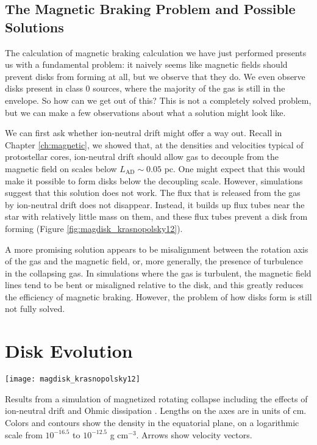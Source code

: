 \subsection{The Magnetic Braking Problem and Possible Solutions}

The calculation of magnetic braking calculation we have just performed presents us with a fundamental problem: it naively seems like magnetic fields should prevent disks from forming at all, but we observe that they do. We even observe disks present in class 0 sources, where the majority of the gas is still in the envelope. So how can we get out of this? This is not a completely solved problem, but we can make a few observations about what a solution might look like.

We can first ask whether ion-neutral drift might offer a way out. Recall in Chapter \ref{ch:magnetic}, we showed that, at the densities and velocities typical of protostellar cores, ion-neutral drift should allow gas to decouple from the magnetic field on scales below $L_{\mathrm{AD}} \sim 0.05$ pc. One might expect that this would make it possible to form disks below the decoupling scale. However, simulations suggest that this solution does not work. The flux that is released from the gas by ion-neutral drift does not disappear. Instead, it builds up flux tubes near the star with relatively little mass on them, and these flux tubes prevent a disk from forming (Figure \ref{fig:magdisk_krasnopolsky12}).

A more promising solution appears to be misalignment between the rotation axis of the gas and the magnetic field, or, more generally, the presence of turbulence in the collapsing gas. In simulations where the gas is turbulent, the magnetic field lines tend to be bent or misaligned relative to the disk, and this greatly reduces the efficiency of magnetic braking. However, the problem of how disks form is still not fully solved.

\section{Disk Evolution}

\begin{marginfigure}
\texttt{[image: magdisk\_krasnopolsky12]}
\caption[Simulations of magnetized rotating collapse with non-ideal MHD]{
\label{fig:magdisk_krasnopolsky12}
Results from a simulation of magnetized rotating collapse including the effects of ion-neutral drift and Ohmic dissipation \citep{krasnopolsky12a}. Lengths on the axes are in units of cm. Colors and contours show the density in the equatorial plane, on a logarithmic scale from $10^{-16.5}$ to $10^{-12.5}$ g cm$^{-3}$. Arrows show velocity vectors.
}
\end{marginfigure}

